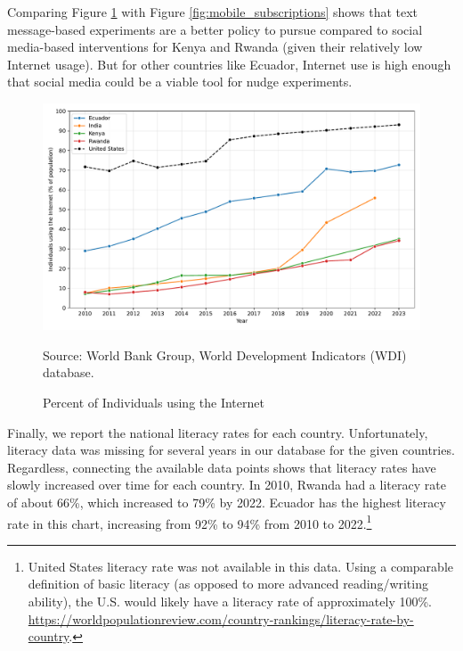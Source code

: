 \documentclass[12pt]{article}
\begin{document}
Comparing Figure \ref{fig:internet_use} with Figure \ref{fig:mobile_subscriptions} shows that text message-based experiments are a better policy to pursue compared to social media-based interventions for Kenya and Rwanda (given their relatively low Internet usage). But for other countries like Ecuador, Internet use is high enough that social media could be a viable tool for nudge experiments.

\begin{figure}[H]
    \centering
    \caption{Percent of Individuals using the Internet}
    \includegraphics[width=\textwidth]{../output/individuals_using_internet.pdf}
    \begin{minipage}{0.9\textwidth}
    \footnotesize
    Source: World Bank Group, World Development Indicators (WDI) database. 
    \end{minipage}
    \label{fig:internet_use}
\end{figure}

Finally, we report the national literacy rates for each country. Unfortunately, literacy data was missing for several years in our database for the given countries. Regardless, connecting the available data points shows that literacy rates have slowly increased over time for each country. In 2010, Rwanda had a literacy rate of about 66\%, which increased to 79\% by 2022. Ecuador has the highest literacy rate in this chart, increasing from 92\% to 94\% from 2010 to 2022.\footnote{United States literacy rate was not available in this data. Using a comparable definition of basic literacy (as opposed to more advanced reading/writing ability), the U.S. would likely have a literacy rate of approximately 100\%. \url{https://worldpopulationreview.com/country-rankings/literacy-rate-by-country}.}
\end{document}
